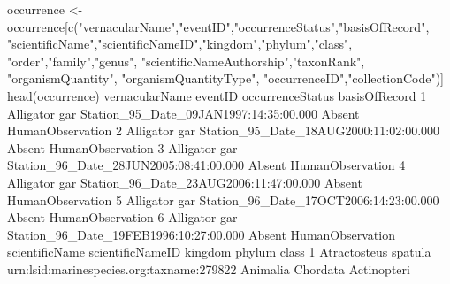 \documentclass[
]{book}
\newenvironment{Shaded}{\begin{snugshade}}{\end{snugshade}}
\newcommand{\DecValTok}[1]{\textcolor[rgb]{0.00,0.00,0.81}{#1}}
\newcommand{\FloatTok}[1]{\textcolor[rgb]{0.00,0.00,0.81}{#1}}
\newcommand{\FunctionTok}[1]{\textcolor[rgb]{0.00,0.00,0.00}{#1}}
\newcommand{\NormalTok}[1]{#1}
\newcommand{\OtherTok}[1]{\textcolor[rgb]{0.56,0.35,0.01}{#1}}
\newcommand{\SpecialCharTok}[1]{\textcolor[rgb]{0.00,0.00,0.00}{#1}}
\newcommand{\StringTok}[1]{\textcolor[rgb]{0.31,0.60,0.02}{#1}}
\begin{document}
\begin{Shaded}
\begin{Highlighting}[]
\NormalTok{occurrence }\OtherTok{\textless{}{-}}\NormalTok{ occurrence[}\FunctionTok{c}\NormalTok{(}\StringTok{"vernacularName"}\NormalTok{,}\StringTok{"eventID"}\NormalTok{,}\StringTok{"occurrenceStatus"}\NormalTok{,}\StringTok{"basisOfRecord"}\NormalTok{,}
                           \StringTok{"scientificName"}\NormalTok{,}\StringTok{"scientificNameID"}\NormalTok{,}\StringTok{"kingdom"}\NormalTok{,}\StringTok{"phylum"}\NormalTok{,}\StringTok{"class"}\NormalTok{,}
                           \StringTok{"order"}\NormalTok{,}\StringTok{"family"}\NormalTok{,}\StringTok{"genus"}\NormalTok{,}
                           \StringTok{"scientificNameAuthorship"}\NormalTok{,}\StringTok{"taxonRank"}\NormalTok{, }\StringTok{"organismQuantity"}\NormalTok{,}
                           \StringTok{"organismQuantityType"}\NormalTok{, }\StringTok{"occurrenceID"}\NormalTok{,}\StringTok{"collectionCode"}\NormalTok{)]}
\FunctionTok{head}\NormalTok{(occurrence)}
\NormalTok{  vernacularName                                eventID occurrenceStatus    basisOfRecord}
\DecValTok{1}\NormalTok{  Alligator gar Station\_95\_Date\_09JAN1997}\SpecialCharTok{:}\DecValTok{14}\SpecialCharTok{:}\DecValTok{35}\SpecialCharTok{:}\FloatTok{00.000}\NormalTok{           Absent HumanObservation}
\DecValTok{2}\NormalTok{  Alligator gar Station\_95\_Date\_18AUG2000}\SpecialCharTok{:}\DecValTok{11}\SpecialCharTok{:}\DecValTok{02}\SpecialCharTok{:}\FloatTok{00.000}\NormalTok{           Absent HumanObservation}
\DecValTok{3}\NormalTok{  Alligator gar Station\_96\_Date\_28JUN2005}\SpecialCharTok{:}\DecValTok{08}\SpecialCharTok{:}\DecValTok{41}\SpecialCharTok{:}\FloatTok{00.000}\NormalTok{           Absent HumanObservation}
\DecValTok{4}\NormalTok{  Alligator gar Station\_96\_Date\_23AUG2006}\SpecialCharTok{:}\DecValTok{11}\SpecialCharTok{:}\DecValTok{47}\SpecialCharTok{:}\FloatTok{00.000}\NormalTok{           Absent HumanObservation}
\DecValTok{5}\NormalTok{  Alligator gar Station\_96\_Date\_17OCT2006}\SpecialCharTok{:}\DecValTok{14}\SpecialCharTok{:}\DecValTok{23}\SpecialCharTok{:}\FloatTok{00.000}\NormalTok{           Absent HumanObservation}
\DecValTok{6}\NormalTok{  Alligator gar Station\_96\_Date\_19FEB1996}\SpecialCharTok{:}\DecValTok{10}\SpecialCharTok{:}\DecValTok{27}\SpecialCharTok{:}\FloatTok{00.000}\NormalTok{           Absent HumanObservation}
\NormalTok{        scientificName                          scientificNameID  kingdom   phylum       class}
\DecValTok{1}\NormalTok{ Atractosteus spatula urn}\SpecialCharTok{:}\NormalTok{lsid}\SpecialCharTok{:}\NormalTok{marinespecies.org}\SpecialCharTok{:}\NormalTok{taxname}\SpecialCharTok{:}\DecValTok{279822}\NormalTok{ Animalia Chordata Actinopteri}

\end{Highlighting}
\end{Shaded}
\end{document}
